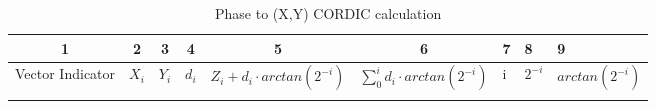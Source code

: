 \begin{landscape}
\begin{table}
\captionsetup{list=off}	%
  \caption{Phase to (X,Y) CORDIC calculation}
  \label{tab:Phase2Cosine}%
    \begin{tabular}{|l|l|r|r|l|l|l|l|l|}
    \toprule
    \multicolumn{1}{c}{1} & \multicolumn{1}{c}{2} & \multicolumn{1}{c}{3} & \multicolumn{1}{c}{4} & \multicolumn{1}{c}{5} & \multicolumn{1}{c}{6} & 7     & 8     & 9 \\
    \midrule
    Vector Indicator & $X_i$ & $Y_i$ & $d_i$ & $Z_i + d_i \cdot arctan(2^{-i})$ & $\sum_{0}^{i} d_i \cdot arctan(2^{-i})$ & i & $2^{-i}$ & $arctan(2^{-i})$ \\
    \multicolumn{1}{c}{} &       &       &       &       &       &       &       &  \\


\end{tabular}
\end{table}
\end{landscape}

